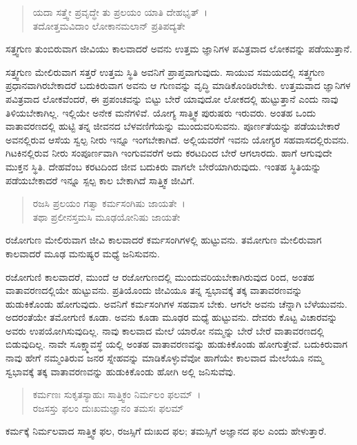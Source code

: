 \begin{verse}
ಯದಾ ಸತ್ತ್ವೇ ಪ್ರವೃದ್ಧೇ ತು ಪ್ರಲಯಂ ಯಾತಿ ದೇಹಭೃತ್~।\\ತದೋತ್ತಮವಿದಾಂ ಲೋಕಾನಮಲಾನ್ ಪ್ರತಿಪದ್ಯತೇ 
\end{verse}

{\small ಸತ್ತ್ವಗುಣ ತುಂಬಿರುವಾಗ ಜೀವಿಯು ಕಾಲವಾದರೆ ಅವನು ಉತ್ತಮ ಜ್ಞಾನಿಗಳ ಪವಿತ್ರವಾದ ಲೋಕವನ್ನು ಪಡೆಯುತ್ತಾನೆ.}

ಸತ್ತ್ವಗುಣ ಮೇಲಿರುವಾಗ ಸತ್ತರೆ ಉತ್ತಮ ಸ್ಥಿತಿ ಅವನಿಗೆ ಪ್ರಾಪ್ತವಾಗುವುದು. ಸಾಯುವ ಸಮಯದಲ್ಲಿ ಸತ್ತ್ವಗುಣ ಪ್ರಧಾನವಾಗಿರಬೇಕಾದರೆ ಬದುಕಿರುವಾಗ ಅವನು ಆ ಗುಣವನ್ನು ವೃದ್ಧಿ ಮಾಡಿಕೊಂಡಿರಬೇಕು. ಉತ್ತಮವಾದ ಜ್ಞಾನಿಗಳ ಪವಿತ್ರವಾದ ಲೋಕವೆಂದರೆ, ಈ ಪ್ರಪಂಚವನ್ನು ಬಿಟ್ಟು ಬೇರೆ ಯಾವುದೋ ಲೋಕದಲ್ಲಿ ಹುಟ್ಟುತ್ತಾನೆ ಎಂದು ನಾವು ತಿಳಿಯಬೇಕಾಗಿಲ್ಲ. ಇಲ್ಲಿಯೇ ಅನೇಕ ಮನೆಗಳಿವೆ. ಯೋಗ್ಯ ಸಾತ್ತ್ವಿಕ ಪುರುಷರು ಇರುವರು. ಅಂತಹ ಒಂದು ವಾತಾವರಣದಲ್ಲಿ ಹುಟ್ಟಿ ತನ್ನ ಜೀವನದ ಬೆಳವಣಿಗೆಯನ್ನು ಮುಂದುವರಿಸುವನು. ಪೂರ್ಣತೆಯನ್ನು ಪಡೆಯಬೇಕಾರೆ ಅವನಲ್ಲಿರುವ ಆಸೆಯ ಸ್ವಲ್ಪ ನೀರು ಇನ್ನೂ ಇಂಗಬೇಕಾಗಿದೆ. ಅಲ್ಲಿಯವರೆಗೆ ಇವನು ಯೋಗ್ಯರ ಸಹವಾಸದಲ್ಲಿರುವನು. ಗಿಟಕಿನಲ್ಲಿರುವ ನೀರು ಸಂಪೂರ್ಣವಾಗಿ ಇಂಗುವವರೆಗೆ ಅದು ಕರಟದಿಂದ ಬೇರೆ ಆಗಲಾರದು. ಹಾಗೆ ಆಗುವುದೇ ಮುಕ್ತನ ಸ್ಥಿತಿ. ದೇಹವೆಂಬ ಕರಟದಿಂದ ಜೀವ ಬದುಕಿರು ವಾಗಲೇ ಬೇರೆಯಾಗಿರುವುದು. ಇಂತಹ ಸ್ಥಿತಿಯನ್ನು ಪಡೆಯಬೇಕಾದರೆ ಇನ್ನೂ ಸ್ಪಲ್ಪ ಕಾಲ ಬೇಕಾಗಿದೆ ಸಾತ್ತ್ವಿಕ ಜೀವಿಗೆ.

\begin{verse}
ರಜಸಿ ಪ್ರಲಯಂ ಗತ್ವಾ ಕರ್ಮಸಂಗಿಷು ಜಾಯತೇ~।\\ತಥಾ ಪ್ರಲೀನಸ್ತಮಸಿ ಮೂಢಯೋನಿಷು ಜಾಯತೇ 
\end{verse}

{\small ರಜೋಗುಣ ಮೇಲಿರುವಾಗ ಜೀವಿ ಕಾಲವಾದರೆ ಕರ್ಮಸಂಗಿಗಳಲ್ಲಿ ಹುಟ್ಟುವನು. ತಮೋಗುಣ ಮೇಲಿರುವಾಗ ಕಾಲವಾದರೆ ಮೂಢ ಮನುಷ್ಯರ ಮಧ್ಯೆ ಜನಿಸುವನು.}

ರಜೋಗುಣಿ ಕಾಲವಾದರೆ, ಮುಂದೆ ಆ ರಜೋಗುಣದಲ್ಲಿ ಮುಂದುವರಿಯಬೇಕಾಗಿರುವುದ ರಿಂದ, ಅಂತಹ ವಾತಾವರಣದಲ್ಲಿಯೇ ಹುಟ್ಟುವನು. ಪ್ರತಿಯೊಂದು ಜೀವಿಯೂ ತನ್ನ ಸ್ವಭಾವಕ್ಕೆ ತಕ್ಕ ವಾತಾವರಣವನ್ನು ಹುಡುಕಿಕೊಂಡು ಹೋಗುವುದು. ಅವನಿಗೆ ಕರ್ಮಸಂಗಿಗಳ ಸಹವಾಸ ಬೇಕು. ಆಗಲೇ ಅವನು ಚೆನ್ನಾಗಿ ಬೆಳೆಯುವನು. ಅದರಂತೆಯೇ ತಮೋಗುಣಿ ಕೂಡಾ. ಅವನು ಕೂಡಾ ಮೂಢರ ಮಧ್ಯೆ ಹುಟ್ಟುವನು. ದೇವರು ಕೊಟ್ಟ ವಿಚಾರವನ್ನು ಅವರು ಉಪಯೋಗಿಸುವುದಿಲ್ಲ. ನಾವು ಕಾಲವಾದ ಮೇಲೆ ಯಾರೋ ನಮ್ಮನ್ನು ಬೇರೆ ಬೇರೆ ವಾತಾವರಣದಲ್ಲಿ ಬಿಡುವುದಿಲ್ಲ. ನಾವೇ ಸೂಕ್ಷ್ಮಾವಸ್ಥೆ ಯಲ್ಲಿ ಅಂತಹ ವಾತಾವರಣವನ್ನು ಹುಡುಕಿಕೊಂಡು ಹೋಗುತ್ತೇವೆ. ಬದುಕಿರುವಾಗ ನಾವು ಹೇಗೆ ನಮ್ಮಂತಿರುವ ಜನರ ಸ್ನೇಹವನ್ನು ಮಾಡಿಕೊಳ್ಳುವೆವೋ ಹಾಗೆಯೇ ಕಾಲವಾದ ಮೇಲೆಯೂ ನಮ್ಮ ಸ್ವಭಾವಕ್ಕೆ ತಕ್ಕ ವಾತಾವರಣವನ್ನು ಹುಡುಕಿಕೊಂಡು ಹೋಗಿ ಅಲ್ಲಿ ಜನಿಸುವೆವು.

\begin{verse}
ಕರ್ಮಣಃ ಸುಕೃತಸ್ಯಾಹುಃ ಸಾತ್ತ್ವಿಕಂ ನಿರ್ಮಲಂ ಫಲಮ್~।\\ರಜಸಸ್ತು ಫಲಂ ದುಃಖಮಜ್ಞಾನಂ ತಮಸಃ ಫಲಮ್ 
\end{verse}

{\small ಕರ್ಮಕ್ಕೆ ನಿರ್ಮಲವಾದ ಸಾತ್ತ್ವಿಕ ಫಲ, ರಜಸ್ಸಿಗೆ ದುಃಖದ ಫಲ; ತಮಸ್ಸಿಗೆ ಅಜ್ಞಾನದ ಫಲ ಎಂದು ಹೇಳುತ್ತಾರೆ.}

